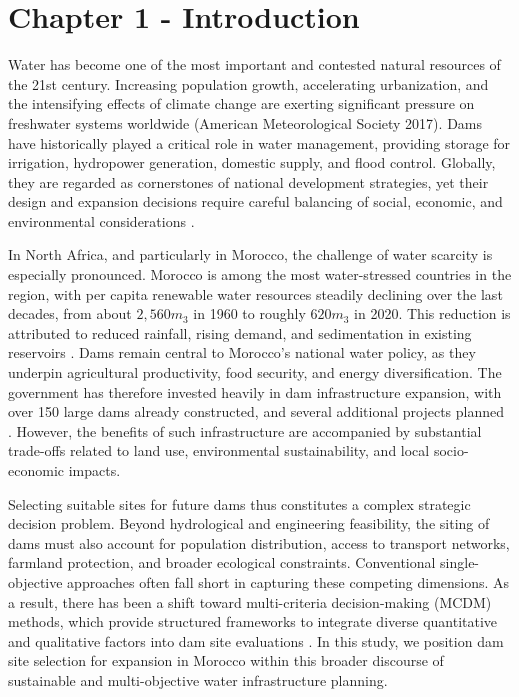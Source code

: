 \section{Chapter 1 - Introduction}\label{sec:introduction} 
\noindent Water has become one of the most important and contested natural resources of the 21st century. Increasing population growth, accelerating urbanization, and the intensifying effects of climate change are exerting significant pressure on freshwater systems worldwide (American Meteorological Society 2017)\cite{AMS2017}. Dams have historically played a critical role in water management, providing storage for irrigation, hydropower generation, domestic supply, and flood control. Globally, they are regarded as cornerstones of national development strategies, yet their design and expansion decisions require careful balancing of social, economic, and environmental considerations \cite{Schmitt2024,AMS2017}.    

In North Africa, and particularly in Morocco, the challenge of water scarcity is especially pronounced. Morocco is among the most water-stressed countries in the region, with per capita renewable water resources steadily declining over the last decades, from about $2,560m_3$ in 1960 to roughly $620m_3$ in 2020. This reduction is attributed to reduced rainfall, rising demand, and sedimentation in existing reservoirs \cite{WorldBank2023}. Dams remain central to Morocco's national water policy, as they underpin agricultural productivity, food security, and energy diversification. The government has therefore invested heavily in dam infrastructure expansion, with over 150 large dams already constructed, and several additional projects planned \cite{TradeGov2024}. However, the benefits of such infrastructure are accompanied by substantial trade-offs related to land use, environmental sustainability, and local socio-economic impacts.

Selecting suitable sites for future dams thus constitutes a complex strategic decision problem. Beyond hydrological and engineering feasibility, the siting of dams must also account for population distribution, access to transport networks, farmland protection, and broader ecological constraints. Conventional single-objective approaches often fall short in capturing these competing dimensions. As a result, there has been a shift toward multi-criteria decision-making (MCDM) methods, which provide structured frameworks to integrate diverse quantitative and qualitative factors into dam site evaluations \cite{TradeGov2024,Minatour2015}. In this study, we position dam site selection  for expansion in Morocco within this broader discourse of sustainable and multi-objective water infrastructure planning.

